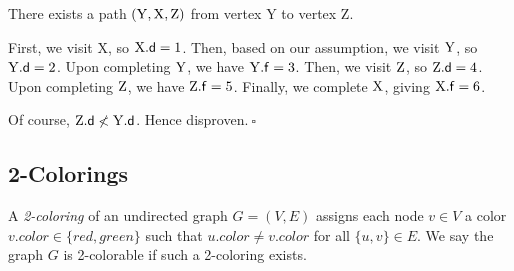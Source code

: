 \begin{enumerate}[start=2]
\begin{solution}
There exists a path $({\rm Y},{\rm X},{\rm Z})$ from vertex Y to vertex Z.

First, we visit X, so ${\rm X}.\mathsf{d}=1$. Then, based on our assumption, we visit ${\rm Y}$, so ${\rm Y}.\mathsf{d}=2$. Upon completing ${\rm Y}$, we have ${\rm Y}.\mathsf{f}=3$. Then, we visit ${\rm Z}$, so ${\rm Z}.\mathsf{d}=4$. Upon completing ${\rm Z}$, we have ${\rm Z}.\mathsf{f}=5$. Finally, we complete ${\rm X}$, giving ${\rm X}.\mathsf{f}=6$. 

Of course, ${\rm Z}.\mathsf{d}\nless{\rm Y}.\mathsf{d}$. Hence disproven.$~\square$
\end{solution}
\end{enumerate}
\newpage
\subsection{2-Colorings}
A \emph{2-coloring} of an undirected graph $G = (V,E)$ assigns each node $v \in V$ a color $v.color \in \{red,green\}$ such that $u.color \neq v.color$ for all $\{u,v\}\in E$. We say the graph $G$ is 2-colorable if such a 2-coloring exists.

